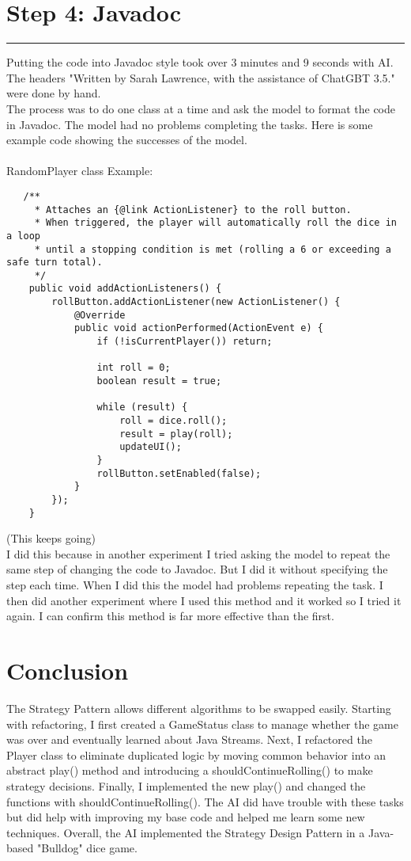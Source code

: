 \documentclass[a4paper,11pt]{article}
\begin{document}
\section*{Step 4: Javadoc}
\hrule
\vspace{10pt} 
Putting the code into Javadoc style took over 3 minutes and 9 seconds with AI. The headers "Written by Sarah Lawrence, with the assistance of ChatGBT 3.5." were done by hand. \\
The process was to do one class at a time and ask the model to format the code in Javadoc. The model had no problems completing the tasks. Here is some example code showing the successes of the model.\\\\
RandomPlayer class Example:
\begin{lstlisting}
   /**
     * Attaches an {@link ActionListener} to the roll button.
     * When triggered, the player will automatically roll the dice in a loop
     * until a stopping condition is met (rolling a 6 or exceeding a safe turn total).
     */
    public void addActionListeners() {
        rollButton.addActionListener(new ActionListener() {
            @Override
            public void actionPerformed(ActionEvent e) {
                if (!isCurrentPlayer()) return;

                int roll = 0;
                boolean result = true;

                while (result) {
                    roll = dice.roll();
                    result = play(roll);
                    updateUI();
                }
                rollButton.setEnabled(false);
            }
        });
    }
\end{lstlisting} (This keeps going)\\
I did this because in another experiment I tried asking the model to repeat the same step of changing the code to Javadoc. But I did it without specifying the step each time. When I did this the model had problems repeating the task. I then did another experiment where I used this method and it worked so I tried it again. I can confirm this method is far more effective than the first. 

\section*{Conclusion}
The Strategy Pattern allows different algorithms to be swapped easily. Starting with refactoring, I first created a GameStatus class to manage whether the game was over and eventually learned about Java Streams. Next, I refactored the Player class to eliminate duplicated logic by moving common behavior into an abstract play() method and introducing a shouldContinueRolling() to make strategy decisions. Finally, I implemented the new play() and changed the functions with shouldContinueRolling(). The AI did have trouble with these tasks but did help with improving my base code and helped me learn some new techniques. Overall, the AI implemented the Strategy Design Pattern in a Java-based "Bulldog" dice game.
\end{document}
